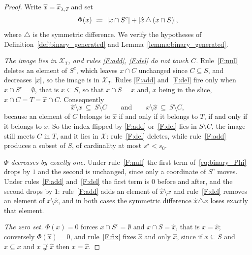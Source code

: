 \documentclass[aos]{imsart}%
\DeclarePairedDelimiter{\abs}{\lvert}{\rvert}
\newcommand{\ambientspace}[0]{\mathcal{X}}
\theoremstyle{plain}
\theoremstyle{definition}
\begin{document}
    \begin{proof}
        Write $\hat x=\hat x_{\lambda,T}$ and set
        \begin{equation}
            \label{eq:binary_Phi}
            \Phi(x)\ \coloneq\ \abs{x\cap S^{c}}
            +\abs{\hat x\,\triangle\,(x\cap S)},
        \end{equation}
        where $\triangle$ is the symmetric difference. We verify the hypotheses
        of Definition~\ref{def:binary_generated} and
        Lemma~\ref{lemma:binary_generated}.

        \emph{The image lies in $\ambientspace_T$, and rules \ref{F:add},
        \ref{F:del} do not touch $C$.} Rule~\ref{F:null} deletes an element of
        $S^{c}$, which leaves $x\cap C$ unchanged since $C\subseteq S$, and
        decreases $\abs x$, so the image is in $\ambientspace_T$. Rules
        \ref{F:add} and~\ref{F:del} fire only when $x\cap S^{c}=\emptyset$,
        that is $x\subseteq S$, so that $x\cap S=x$ and, $x$ being in the
        slice, $x\cap C=T=\hat x\cap C$. Consequently
        \begin{equation}
            \label{eq:binary_symdiff_offC}
            \hat x\setminus x\ \subseteq\ S\setminus C
            \qquad\text{and}\qquad
            x\setminus\hat x\ \subseteq\ S\setminus C,
        \end{equation}
        because an element of $C$ belongs to $\hat x$ if and only if it belongs
        to $T$, if and only if it belongs to $x$. So the index flipped by
        \ref{F:add} or~\ref{F:del} lies in $S\setminus C$, the image still
        meets $C$ in $T$, and it lies in $\ambientspace$: rule~\ref{F:del}
        deletes, while rule~\ref{F:add} produces a subset of $S$, of
        cardinality at most $s^{\star}<s_0$.

        \emph{$\Phi$ decreases by exactly one.} Under rule~\ref{F:null} the
        first term of~\eqref{eq:binary_Phi} drops by $1$ and the second is
        unchanged, since only a coordinate of $S^{c}$ moves. Under
        rules~\ref{F:add} and~\ref{F:del} the first term is $0$ before and
        after, and the second drops by $1$: rule~\ref{F:add} adds an element of
        $\hat x\setminus x$ and rule~\ref{F:del} removes an element of
        $x\setminus\hat x$, and in both cases the symmetric difference
        $\hat x\triangle x$ loses exactly that element.

        \emph{The zero set.} $\Phi(x)=0$ forces $x\cap S^{c}=\emptyset$ and
        $x\cap S=\hat x$, that is $x=\hat x$; conversely $\Phi(\hat x)=0$, and
        rule~\ref{F:fix} fixes $\hat x$ and only $\hat x$, since if
        $x\subseteq S$ and $\hat x\subseteq x$ and $x\not\supsetneq\hat x$ then
        $x=\hat x$.


\end{proof}
\end{document}
